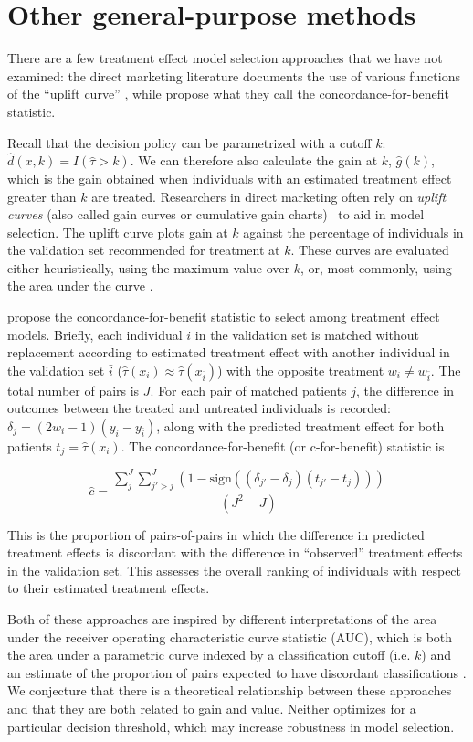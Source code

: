 \section{Other general-purpose methods}

There are a few treatment effect model selection approaches that we have not examined: the direct marketing literature documents the use of various functions of the ``uplift curve'' \cite{Gutierrez:2016tq}, while \citet{vanKlaveren:2018gg} propose what they call the concordance-for-benefit statistic. 

Recall that the decision policy can be parametrized with a cutoff $k$: $\hat d(x,k) = I(\hat\tau>k)$. We can therefore also calculate the gain at $k$, $\hat g(k)$, which is the gain obtained when individuals with an estimated treatment effect greater than $k$ are treated. Researchers in direct marketing often rely on \emph{uplift curves} (also called gain curves or cumulative gain charts) \ to aid in model selection. The uplift curve plots gain at $k$ against the percentage of individuals in the validation set recommended for treatment at $k$. These curves are evaluated either heuristically, using the maximum value over $k$, or, most commonly, using the area under the curve \cite{Gutierrez:2016tq}.

\citet{vanKlaveren:2018gg} propose the concordance-for-benefit statistic to select among treatment effect models. Briefly, each individual $i$ in the validation set is matched without replacement according to estimated treatment effect with another individual in the validation set $\bar{i}$ ($\hat\tau(x_i) \approx \hat\tau(x_{\bar i})$) with the opposite treatment $w_i \ne w_{\bar i}$. The total number of pairs is $J$. For each pair of matched patients $j$, the difference in outcomes between the treated and untreated individuals is recorded: $\delta_j = (2w_i - 1)(y_i -y_{\bar i})$, along with the predicted treatment effect for both patients $t_j = \hat\tau(x_i)$. The concordance-for-benefit (or c-for-benefit) statistic is

\[
\hat c = \frac{\sum_j^J \sum_{j' > j}^J (1 - \text{sign}((\delta_{j'} - \delta_j)(t_{j'} - t_j))) }{(J^2-J)}
\]

This is the proportion of pairs-of-pairs in which the difference in predicted treatment effects is discordant with the difference in ``observed'' treatment effects in the validation set. This assesses the overall ranking of individuals with respect to their estimated treatment effects.

Both of these approaches are inspired by different interpretations of the area under the receiver operating characteristic curve statistic (AUC), which is both the area under a parametric curve indexed by a classification cutoff (i.e. $k$) and an estimate of the proportion of pairs expected to have discordant classifications \cite{Hanley:1982cz}. We conjecture that there is a theoretical relationship between these approaches and that they are both related to gain and value. Neither optimizes for a particular decision threshold, which may increase robustness in model selection.

